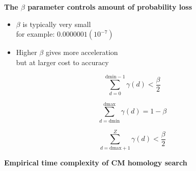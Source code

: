\documentclass[landscape]{slides}
\begin{document}
\begin{slide}
\begin{center}
\textbf{The $\beta$ parameter controls amount of probability loss}
\end{center}

\begin{minipage}{6in}


\vspace{1in}
\begin{itemize} 
\item $\beta$ is typically very small \\
  for example: $0.0000001 (10^{-7})$

\item Higher $\beta$ gives more acceleration \\ but at larger cost to
  accuracy
\end{itemize}

\vspace{1.5in}
\end{minipage}
\begin{minipage}{4in}

\small

\[
   \sum_{d = 0}^{\mbox{dmin} - 1} \gamma(d) < \frac{\beta}{2}
\]

\[
   \sum_{d = \mbox{dmin}}^{\mbox{dmax}} \gamma(d) = 1 - \beta
\]

\[
   \sum_{d = \mbox{dmax} + 1}^{Z} \gamma(d) < \frac{\beta}{2}
\]


\vspace{3in}
\end{minipage}


\end{slide}

\begin{slide}
\begin{center}
\textbf{Empirical time complexity of CM homology search}
\end{center}


\vfill
\end{slide}
\end{document}
